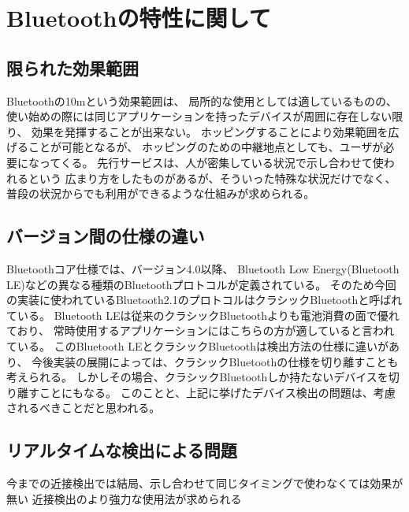 \section{Bluetoothの特性に関して}

\subsection{限られた効果範囲}

Bluetoothの10mという効果範囲は、
局所的な使用としては適しているものの、
使い始めの際には同じアプリケーションを持ったデバイスが周囲に存在しない限り、
効果を発揮することが出来ない。
ホッピングすることにより効果範囲を広げることが可能となるが、
ホッピングのための中継地点としても、ユーザが必要になってくる。
先行サービスは、人が密集している状況で示し合わせて使われるという
広まり方をしたものがあるが、そういった特殊な状況だけでなく、
普段の状況からでも利用ができるような仕組みが求められる。

\subsection{バージョン間の仕様の違い}

Bluetoothコア仕様では、バージョン4.0以降、
Bluetooth Low Energy(Bluetooth LE)などの異なる種類のBluetoothプロトコルが定義されている。
そのため今回の実装に使われているBluetooth2.1のプロトコルはクラシックBluetoothと呼ばれている。
Bluetooth LEは従来のクラシックBluetoothよりも電池消費の面で優れており、
常時使用するアプリケーションにはこちらの方が適していると言われている。
このBluetooth LEとクラシックBluetoothは検出方法の仕様に違いがあり、
今後実装の展開によっては、クラシックBluetoothの仕様を切り離すことも考えられる。
しかしその場合、クラシックBluetoothしか持たないデバイスを切り離すことにもなる。
このことと、上記に挙げたデバイス検出の問題は、考慮されるべきことだと思われる。

\subsection{リアルタイムな検出による問題}

今までの近接検出では結局、示し合わせて同じタイミングで使わなくては効果が無い
近接検出のより強力な使用法が求められる
